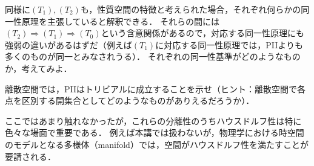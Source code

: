\documentclass[11pt,a4paper]{jsarticle}
\begin{document}
\begin{exercise}
同様に$(T_1), (T_2)$も，性質空間の特徴と考えられた場合，それぞれ何らかの同一性原理を主張していると解釈できる．
それらの間には$(T_2) \Rightarrow (T_1) \Rightarrow (T_0)$という含意関係があるので，対応する同一性原理にも強弱の違いがあるはずだ（例えば$(T_1)$に対応する同一性原理では，PIIよりも多くのものが同一とみなされうる）．
それぞれの同一性基準がどのようなものか，考えてみよ．
\end{exercise}

\begin{exercise}
離散空間では，PIIはトリビアルに成立することを示せ（ヒント：離散空間で各点を区別する開集合としてどのようなものがありえるだろうか）．
\end{exercise}

\begin{develop}
ここではあまり触れなかったが，これらの分離性のうちハウスドルフ性は特に色々な場面で重要である．
例えば本講では扱わないが，物理学における時空間のモデルとなる多様体（manifold）では，空間がハウスドルフ性を満たすことが要請される．
\end{develop}

\end{document}
